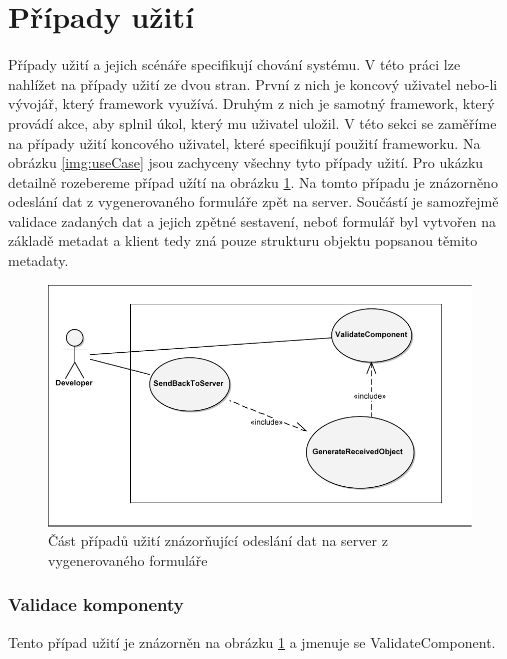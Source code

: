 \section{Případy užití}
Případy užití a jejich scénáře \cite{UmlArlow} specifikují chování systému. V této práci lze nahlížet na případy užití ze dvou stran. První z nich je koncový uživatel nebo-li vývojář, který framework využívá. Druhým z nich je samotný framework, který provádí akce, aby splnil úkol, který mu uživatel uložil. V této sekci se zaměříme na případy užití koncového uživatel, které specifikují použití frameworku. Na obrázku \ref{img:useCase} jsou zachyceny všechny tyto případy užití. Pro ukázku detailně rozebereme případ užítí na obrázku \ref{img:useCaseSmall}. Na tomto případu je znázorněno odeslání dat z vygenerovaného formuláře zpět na server. Součástí je samozřejmě validace zadaných dat a jejich zpětné sestavení, neboť formulář byl vytvořen na základě metadat a klient tedy zná pouze strukturu objektu popsanou těmito metadaty. 
\begin{figure}[h!]
\begin{center}
\includegraphics{images/useCaseSmall}
\caption{Část případů užití znázorňující odeslání dat na server z vygenerovaného formuláře}
\label{img:useCaseSmall}
\end{center}
\end{figure}
\subsubsection{Validace komponenty}
Tento případ užití je znázorněn na obrázku \ref{img:useCaseSmall} a jmenuje se ValidateComponent.

